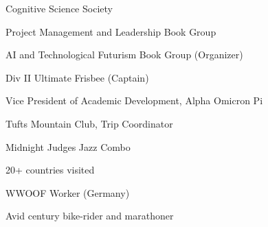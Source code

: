 \documentclass[]{csaund_resume-openfont}
\begin{document}
\descript{ }
\begin{tightemize}
\item Cognitive Science Society
\item Project Management and Leadership Book Group 
\item AI and Technological Futurism Book Group (Organizer)
\item Div II Ultimate Frisbee (Captain)
\end{tightemize}
\begin{tightemize}
\item Vice President of Academic Development, Alpha Omicron Pi
\item Tufts Mountain Club, Trip Coordinator
\item Midnight Judges Jazz Combo
\end{tightemize}
\begin{tightemize}
\item 20+ countries visited
\item WWOOF Worker (Germany)
\item Avid century bike-rider and marathoner
\end{tightemize}
\sectionsep
\end{document}
